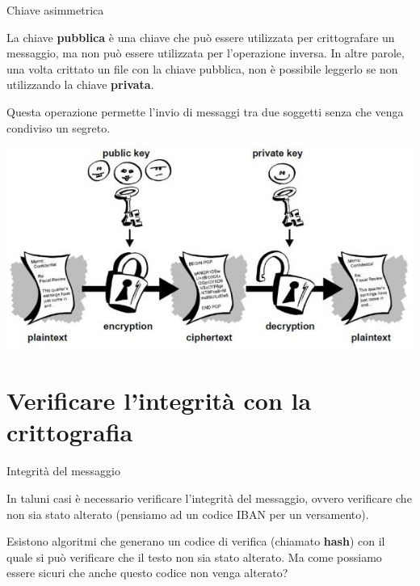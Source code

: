\documentclass[10pt]{beamer}
\begin{document}
\begin{frame}{Chiave asimmetrica}

La chiave \textbf{pubblica} è una chiave che può essere utilizzata per crittografare un messaggio, ma non può essere utilizzata per l'operazione inversa. In altre parole, una volta crittato un file con la chiave pubblica, non è possibile leggerlo se non utilizzando la chiave \textbf{privata}.

Questa operazione permette l'invio di messaggi tra due soggetti senza che venga condiviso un segreto.

\centering
\includegraphics[scale=0.4]{public-key-cryptography}

\end{frame}

\section{Verificare l'integrità con la crittografia}

\begin{frame}{Integrità del messaggio}

In taluni casi è necessario verificare l'integrità del messaggio, ovvero verificare che non sia stato alterato (pensiamo ad un codice IBAN per un versamento).

Esistono algoritmi che generano un codice di verifica (chiamato \textbf{hash}) con il quale si può verificare che il testo non sia stato alterato. Ma come possiamo essere sicuri che anche questo codice non venga alterato?

\end{frame}
\end{document}
